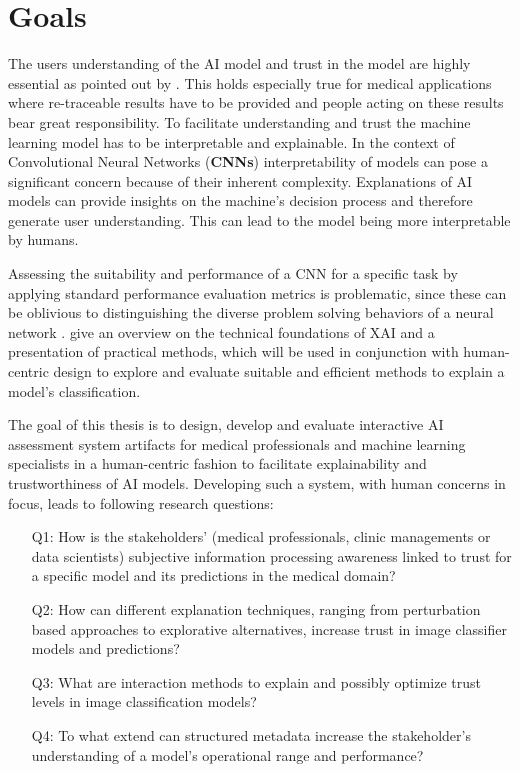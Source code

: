 \documentclass[11pt,a4paper,english]{scrreprt}
\begin{document}
\section{Goals}\label{section:goals}
The users understanding of the AI model and trust in the model are highly essential as pointed out by \textcite{knapic_explainable_2021}. This holds especially true for medical applications where re-traceable results have to be provided and people acting on these results bear great responsibility. To facilitate understanding and trust the machine learning model has to be interpretable and explainable. In the context of Convolutional Neural Networks (\textbf{CNNs}) interpretability of models can pose a significant concern because of their inherent complexity. Explanations of AI models can provide insights on the machine's decision process and therefore generate user understanding. This can lead to the model being more interpretable by humans.

Assessing the suitability and performance of a CNN for a specific task by applying standard performance evaluation metrics is problematic, since these can be oblivious to distinguishing the diverse problem solving behaviors of a neural network \parencite{lapuschkin_unmasking_2019}. \textcite{samek_explaining_2021,JMLR:v17:15-618,ribeiro_anchors_2018} give an overview on the technical foundations of XAI and a presentation of practical methods, which will be used in conjunction with human-centric design to explore and evaluate suitable and efficient methods to explain a model's classification.

The goal of this thesis is to design, develop and evaluate interactive AI assessment system artifacts for medical professionals and machine learning specialists in a human-centric fashion to facilitate explainability and trustworthiness of AI models. Developing such a system, with human concerns in focus, leads to following research questions:
\begin{itemize}
    \item[Q1:] How is the stakeholders' (medical professionals, clinic managements or data scientists) subjective information processing awareness linked to trust for a specific model and its predictions in the medical domain?
    \item[Q2:] How can different explanation techniques, ranging from perturbation based approaches to explorative alternatives, increase trust in image classifier models and predictions?
    \item[Q3:] What are interaction methods to explain and possibly optimize trust levels in image classification models?
    \item[Q4:] To what extend can structured metadata increase the stakeholder's understanding of a model's operational range and performance?
\end{itemize}
\end{document}
